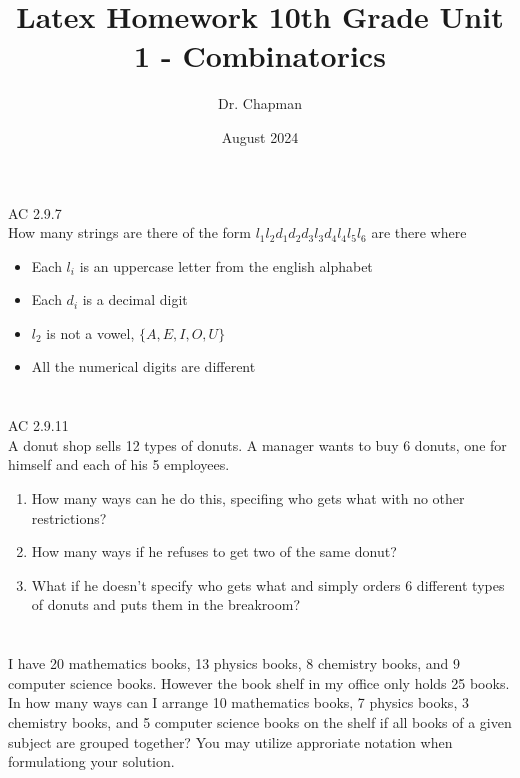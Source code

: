 \documentclass{article}
\title{Latex Homework 10th Grade Unit 1 - Combinatorics}
\author{Dr. Chapman}
\date{August 2024}
\begin{document}
\maketitle

\section{}
AC 2.9.7\\
How many strings are there of the form $l_1l_2d_1d_2d_3l_3d_4l_4l_5l_6$ are there where
\begin{itemize}
  \item Each $l_i$ is an uppercase letter from the english alphabet
  \item Each $d_i$ is a decimal digit
  \item $l_2$ is not a vowel, $\{A, E, I, O, U\}$
  \item All the numerical digits are different
\end{itemize}
\section{}
AC 2.9.11\\
A donut shop sells 12 types of donuts. A manager wants to buy 6 donuts, one for himself and each of his 5 employees.
\begin{enumerate}
    \item How many ways can he do this, specifing who gets what with no other restrictions?
    \item How many ways if he refuses to get two of the same donut?
    \item What if he doesn't specify who gets what and simply orders 6 different types of donuts and puts them in the breakroom?
\end{enumerate}
\section{}
I have 20 mathematics books, 13 physics books, 8 chemistry books, and 9 computer science books. However the book shelf in my office only holds 25 books. In how many ways can I arrange 10 mathematics books, 7 physics books, 3 chemistry books, and 5 computer science books on the shelf if all books of a given subject are grouped together? You may utilize approriate notation when formulationg your solution.
\end{document}

